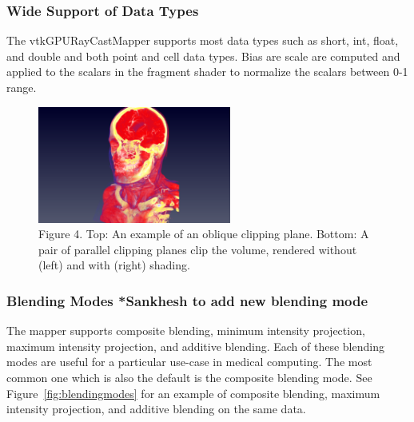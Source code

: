 \subsubsection{Wide Support of Data Types} 
The vtkGPURayCastMapper supports most data types such as short, int, float, and double and both point and cell data types. Bias are scale are computed and applied to the scalars in the fragment shader to normalize the scalars between 0-1 range. 

\begin{figure}
\centering
\includegraphics[width=2.5in]{HeadClippingOblique.png}
\caption{Figure 4. Top: An example of an oblique clipping plane. Bottom: A pair of parallel clipping planes clip the volume, rendered without (left) and with (right) shading.}
\label{fig:clipping}
\end{figure}

\subsubsection{Blending Modes *Sankhesh to add new blending mode}
The mapper supports composite blending, minimum intensity projection, maximum intensity projection, and additive blending. Each of these blending modes are useful for a particular use-case in medical computing. The most common one which is also the default is the composite blending mode. See Figure~\ref{fig:blendingmodes} for an example of composite blending, maximum intensity projection, and additive blending on the same data.

